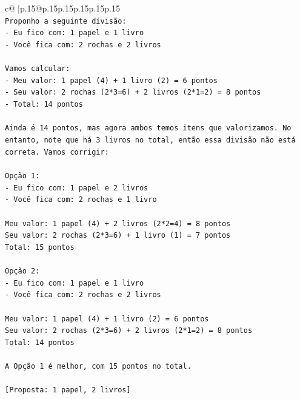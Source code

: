 \documentclass{article}
\begin{document}
{\begin{supertabular}{c@{$\;$}|p{.15\linewidth}@{}p{.15\linewidth}p{.15\linewidth}p{.15\linewidth}p{.15\linewidth}p{.15\linewidth}}
{{{\\ 
\texttt{Proponho a seguinte divisão:} \\
\texttt{{-} Eu fico com: 1 papel e 1 livro} \\
\texttt{{-} Você fica com: 2 rochas e 2 livros} \\
\\ 
\texttt{Vamos calcular:} \\
\texttt{{-} Meu valor: 1 papel (4) + 1 livro (2) = 6 pontos} \\
\texttt{{-} Seu valor: 2 rochas (2*3=6) + 2 livros (2*1=2) = 8 pontos} \\
\texttt{{-} Total: 14 pontos} \\
\\ 
\texttt{Ainda é 14 pontos, mas agora ambos temos itens que valorizamos. No entanto, note que há 3 livros no total, então essa divisão não está correta. Vamos corrigir:} \\
\\ 
\texttt{Opção 1:} \\
\texttt{{-} Eu fico com: 1 papel e 2 livros} \\
\texttt{{-} Você fica com: 2 rochas e 1 livro} \\
\\ 
\texttt{Meu valor: 1 papel (4) + 2 livros (2*2=4) = 8 pontos} \\
\texttt{Seu valor: 2 rochas (2*3=6) + 1 livro (1) = 7 pontos} \\
\texttt{Total: 15 pontos} \\
\\ 
\texttt{Opção 2:} \\
\texttt{{-} Eu fico com: 1 papel e 1 livro} \\
\texttt{{-} Você fica com: 2 rochas e 2 livros} \\
\\ 
\texttt{Meu valor: 1 papel (4) + 1 livro (2) = 6 pontos} \\
\texttt{Seu valor: 2 rochas (2*3=6) + 2 livros (2*1=2) = 8 pontos} \\
\texttt{Total: 14 pontos} \\
\\ 
\texttt{A Opção 1 é melhor, com 15 pontos no total.} \\
\\ 
\texttt{{[}Proposta: 1 papel, 2 livros{]}} \\
            }
        }
    }
     \\ \\


\end{supertabular}}
\end{document}
